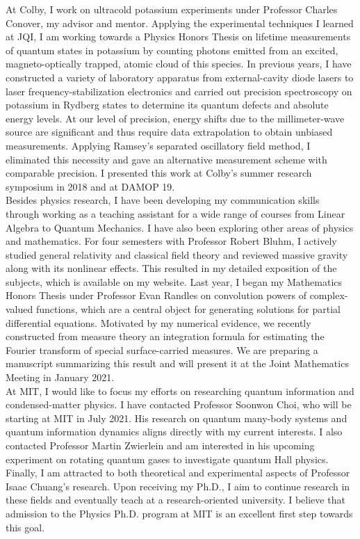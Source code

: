 \documentclass[12pt]{article}
\begin{document}
At Colby, I work on ultracold potassium experiments under Professor Charles Conover, my advisor and mentor. Applying the experimental techniques I learned at JQI, I am working towards a Physics Honors Thesis on lifetime measurements of quantum states in potassium by counting photons emitted from an excited, magneto-optically trapped, atomic cloud of this species. In previous years, I have constructed a variety of laboratory apparatus from external-cavity diode lasers to laser frequency-stabilization electronics and carried out precision spectroscopy on potassium in Rydberg states to determine its quantum defects and absolute energy levels. At our level of precision, energy shifts due to the millimeter-wave source are significant and thus require data extrapolation to obtain unbiased measurements. Applying Ramsey's separated oscillatory field method, I eliminated this necessity and gave an alternative measurement scheme with comparable precision. I presented this work at Colby's summer research symposium in 2018 and at DAMOP 19.  \\

Besides physics research, I have been developing my communication skills through working as a teaching assistant for a wide range of courses from Linear Algebra to Quantum Mechanics. I have also been exploring other areas of physics and mathematics. For four semesters with Professor Robert Bluhm, I actively studied general relativity and classical field theory and reviewed massive gravity along with its nonlinear effects. This resulted in my detailed exposition of the subjects, which is available on my website. Last year, I began my Mathematics Honors Thesis under Professor Evan Randles on convolution powers of complex-valued functions, which are a central object for generating solutions for partial differential equations. Motivated by my numerical evidence, we recently constructed from measure theory an integration formula for estimating the Fourier transform of special surface-carried measures. We are preparing a manuscript summarizing this result and will present it at the Joint Mathematics Meeting in January 2021. \\ 

At MIT, I would like to focus my efforts on researching quantum information and condensed-matter physics. I have contacted Professor Soonwon Choi, who will be starting at MIT in July 2021. His research on quantum many-body systems and quantum information dynamics aligns directly with my current interests. I also contacted Professor Martin Zwierlein and am interested in his upcoming experiment on rotating quantum gases to investigate quantum Hall physics. Finally, I am attracted to both theoretical and experimental aspects of Professor Isaac Chuang's research. Upon receiving my Ph.D., I aim to continue research in these fields and eventually teach at a research-oriented university. I believe that admission to the Physics Ph.D. program at MIT is an excellent first step towards this goal. \\
\end{document}
